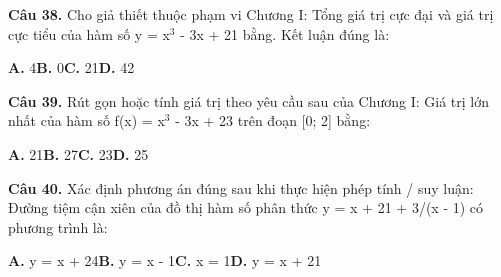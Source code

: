 \documentclass[11pt,a4paper]{article}
\begin{document}
\textbf{\color{primary} Câu 38.} Cho giả thiết thuộc phạm vi Chương I: Tổng giá trị cực đại và giá trị cực tiểu của hàm số y = x$^3$ - 3x + 21 bằng. Kết luận đúng là:\par
\hspace*{1.5em}\textbf{A.} 4\quad\quad \textbf{B.} 0\quad\quad \textbf{C.} 21\quad\quad \textbf{D.} 42\par\vspace{2pt}
\textbf{\color{primary} Câu 39.} Rút gọn hoặc tính giá trị theo yêu cầu sau của Chương I: Giá trị lớn nhất của hàm số f(x) = x$^3$ - 3x + 23 trên đoạn [0; 2] bằng:\par
\hspace*{1.5em}\textbf{A.} 21\quad\quad \textbf{B.} 27\quad\quad \textbf{C.} 23\quad\quad \textbf{D.} 25\par\vspace{2pt}
\textbf{\color{primary} Câu 40.} Xác định phương án đúng sau khi thực hiện phép tính / suy luận: Đường tiệm cận xiên của đồ thị hàm số phân thức y = x + 21 + 3/(x - 1) có phương trình là:\par
\hspace*{1.5em}\textbf{A.} y = x + 24\quad\quad \textbf{B.} y = x - 1\quad\quad \textbf{C.} x = 1\quad\quad \textbf{D.} y = x + 21\par\vspace{2pt}
\end{document}
